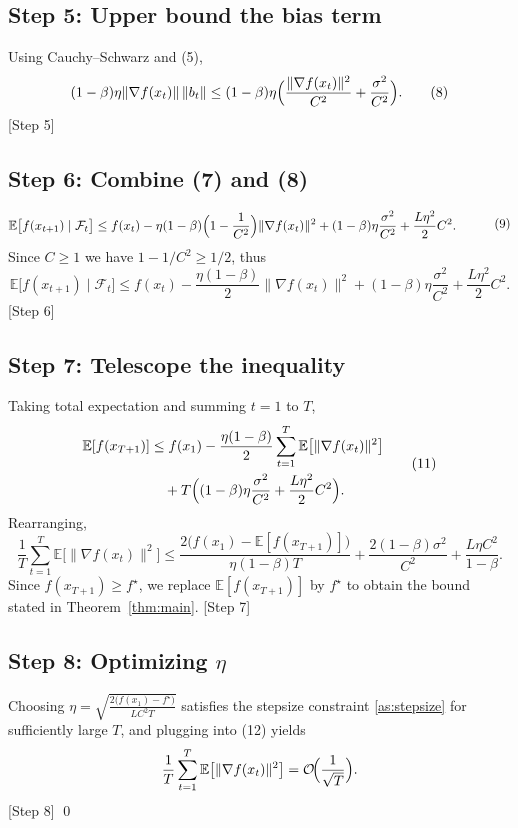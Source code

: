 \documentclass{article}
\newcommand{\E}{\mathbb{E}}
\begin{document}
\subsection*{Step 5: Upper bound the bias term}
Using Cauchy–Schwarz and (5),
\[
(1-\beta)\eta\| \nabla f(x_t)\|\,\|b_t\|
\le (1-\beta)\eta\Bigl(\frac{\|\nabla f(x_t)\|^2}{C^2}+\frac{\sigma^2}{C^2}\Bigr) .
\tag{8}
\]
[Step 5]

\subsection*{Step 6: Combine (7) and (8)}
\[
\begin{aligned}
\E\bigl[f(x_{t+1})\mid\mathcal F_t\bigr]
\le &\; f(x_t)
 -\eta(1-\beta)\Bigl(1-\frac{1}{C^2}\Bigr)\|\nabla f(x_t)\|^2
 + (1-\beta)\eta\frac{\sigma^2}{C^2}
 +\frac{L\eta^2}{2}C^2 .
\end{aligned}
\tag{9}
\]
Since $C\ge 1$ we have $1-1/C^2\ge 1/2$, thus
\[
\E\bigl[f(x_{t+1})\mid\mathcal F_t\bigr]
\le f(x_t)-\frac{\eta(1-\beta)}{2}\|\nabla f(x_t)\|^2
+(1-\beta)\eta\frac{\sigma^2}{C^2}
+\frac{L\eta^2}{2}C^2 .
\tag{10}
\]
[Step 6]

\subsection*{Step 7: Telescope the inequality}
Taking total expectation and summing $t=1$ to $T$,
\[
\begin{aligned}
\E[f(x_{T+1})]
&\le f(x_1)-\frac{\eta(1-\beta)}{2}\sum_{t=1}^{T}\E\bigl[\|\nabla f(x_t)\|^2\bigr] \\
&\quad +T\Bigl((1-\beta)\eta\frac{\sigma^2}{C^2}+\frac{L\eta^2}{2}C^2\Bigr).
\end{aligned}
\tag{11}
\]
Rearranging,
\[
\frac{1}{T}\sum_{t=1}^{T}\E\bigl[\|\nabla f(x_t)\|^2\bigr]
\le
\frac{2\bigl(f(x_1)-\E[f(x_{T+1})]\bigr)}{\eta(1-\beta)T}
+ \frac{2(1-\beta)\sigma^2}{C^2}
+ \frac{L\eta C^2}{1-\beta}.
\tag{12}
\]
Since $f(x_{T+1})\ge f^\star$, we replace $\E[f(x_{T+1})]$ by $f^\star$ to obtain the bound stated in Theorem~\ref{thm:main}.  
[Step 7]

\subsection*{Step 8: Optimizing $\eta$}
Choosing $\eta = \sqrt{\frac{2\bigl(f(x_1)-f^\star\bigr)}{L C^2 T}}$ satisfies the stepsize constraint \ref{as:stepsize} for sufficiently large $T$, and plugging into (12) yields
\[
\frac{1}{T}\sum_{t=1}^{T}\E\bigl[\|\nabla f(x_t)\|^2\bigr]
= \mathcal O\!\Bigl(\frac{1}{\sqrt{T}}\Bigr).
\]
[Step 8] \qed
\end{document}
